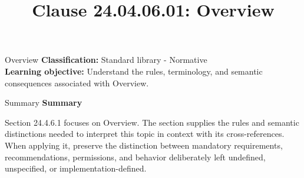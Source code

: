 \documentclass[10pt,letterpaper]{article}
\title{Clause 24.04.06.01: Overview}
\author{}
\date{}
\begin{document}
\maketitle
\begin{CornellOverviewBox}{Overview}
\textbf{Classification:} Standard library - Normative\\[2pt]
\textbf{Learning objective:} Understand the rules, terminology, and semantic consequences associated with Overview.
\end{CornellOverviewBox}\begin{CornellSummaryBox}{Summary}
{\sffamily\bfseries\color{Accent} Summary}\par\vspace{3pt}Section 24.4.6.1 focuses on Overview. The section supplies the rules and semantic distinctions needed to interpret this topic in context with its cross-references. When applying it, preserve the distinction between mandatory requirements, recommendations, permissions, and behavior deliberately left undefined, unspecified, or implementation-defined.
\end{CornellSummaryBox}
\end{document}
